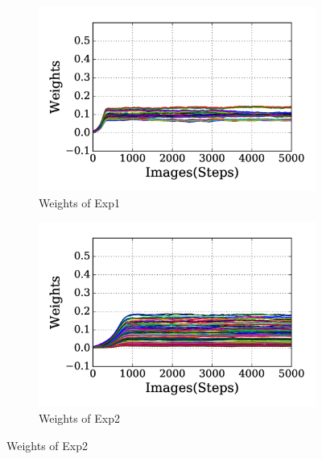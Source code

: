 \begin{figure}
	\centering
	\DIFdelbeginFL %
\DIFdelendFL \DIFaddbeginFL \begin{subfigure}[t]{0.48\textwidth}
		\DIFaddendFL \includegraphics[width=\textwidth]{pics_sdlm/30_exp_RBM/exp1_weights_non.png}
		\caption{Weights of Exp1}
	\end{subfigure}
	\DIFdelbeginFL %
\DIFdelendFL \DIFaddbeginFL \begin{subfigure}[t]{0.48\textwidth}
		\DIFaddendFL \includegraphics[width=\textwidth]{pics_sdlm/30_exp_RBM/exp2_weights_non.png}
		\caption{Weights of Exp2}
	\end{subfigure}
	\DIFdelbeginFL %

\end{figure}
